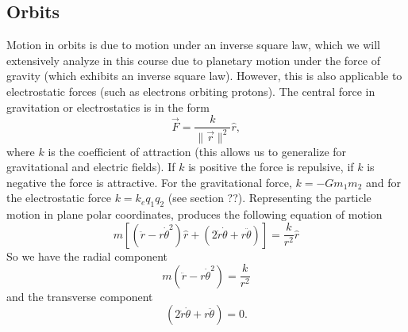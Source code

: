 \subsection{Orbits}

Motion in orbits is due to motion under an inverse square law, which we will extensively analyze in this course due to planetary motion under the force of gravity (which exhibits an inverse square law). However, this is also applicable to electrostatic forces (such as electrons orbiting protons). The central force in gravitation or electrostatics is in the form
\begin{equation}
    \vec{F} = \frac{k}{\| \vec{r} \|^2} \hat{r},
\end{equation}
where $k$ is the coefficient of attraction (this allows us to generalize for gravitational and electric fields). If $k$ is positive the force is repulsive, if $k$ is negative the force is attractive. For the gravitational force, $k = -Gm_1m_2$ and for the electrostatic force $k = k_e q_1 q_2$ (see section ??). Representing the particle motion in plane polar coordinates, produces the following equation of motion 
\begin{equation}
    \label{eq:orbits-motion-1}
    m \left[\left(\ddot{r} - r \dot{\theta}^2\right)\hat{r} + \left(2\dot{r}\dot{\theta} + r \ddot{\theta}\right)\right] = \frac{k}{r^2}\hat{r}
\end{equation}
So we have the radial component
\begin{equation}
    m\left(\ddot{r} - r \dot{\theta}^2\right) = \frac{k}{r^2}
\end{equation}
and the transverse component
\begin{equation}
    \left(2 \dot{r} \dot{\theta} + r \ddot{\theta}\right) = 0.
\end{equation}

